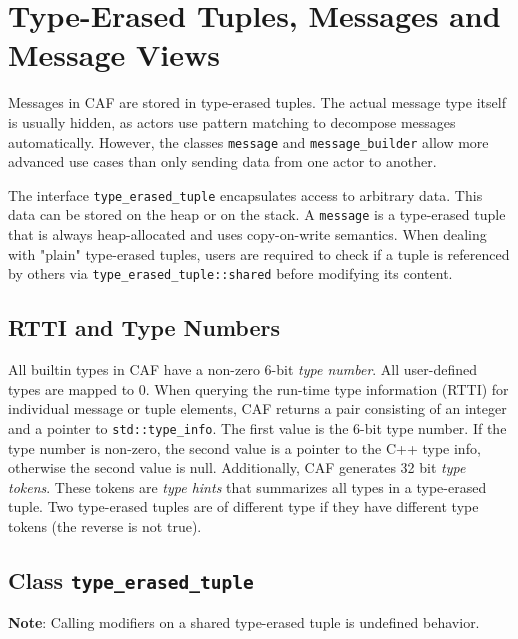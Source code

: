 \section{Type-Erased Tuples, Messages and Message Views}
\label{message}

Messages in CAF are stored in type-erased tuples. The actual message type
itself is usually hidden, as actors use pattern matching to decompose messages
automatically. However, the classes \lstinline^message^ and
\lstinline^message_builder^ allow more advanced use cases than only sending
data from one actor to another.

The interface \lstinline^type_erased_tuple^ encapsulates access to arbitrary
data. This data can be stored on the heap or on the stack. A
\lstinline^message^ is a type-erased tuple that is always heap-allocated and
uses copy-on-write semantics. When dealing with "plain" type-erased tuples,
users are required to check if a tuple is referenced by others via
\lstinline^type_erased_tuple::shared^ before modifying its content.

\subsection{RTTI and Type Numbers}

All builtin types in CAF have a non-zero 6-bit \emph{type number}. All
user-defined types are mapped to 0. When querying the run-time type information
(RTTI) for individual message or tuple elements, CAF returns a pair consisting
of an integer and a pointer to \lstinline^std::type_info^. The first value is
the 6-bit type number. If the type number is non-zero, the second value is a
pointer to the C++ type info, otherwise the second value is null. Additionally,
CAF generates 32 bit \emph{type tokens}. These tokens are \emph{type hints}
that summarizes all types in a type-erased tuple. Two type-erased tuples are of
different type if they have different type tokens (the reverse is not true).

\clearpage
\subsection{Class \lstinline^type_erased_tuple^}

\textbf{Note}: Calling modifiers on a shared type-erased tuple is undefined
behavior.

